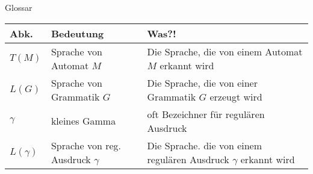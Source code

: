 \begin{frame}[fragile]{Glossar}
	\small
	\begin{tabular}{p{} p{} p{}}
		\toprule
		Abk.        & Bedeutung                          & Was?!                                                               \\
		\midrule
		$T(M)$        & Sprache von Automat $M$              & Die Sprache, die von einem Automat $M$ erkannt wird                   \\
		$L(G)$        & Sprache von Grammatik $G$            & Die Sprache, die von einer Grammatik $G$ erzeugt wird                 \\
		$\gamma$    & kleines Gamma                      & oft Bezeichner für regulären Ausdruck                               \\
		$L(\gamma)$ & Sprache von reg. Ausdruck $\gamma$ & Die Sprache. die von einem regulären Ausdruck $\gamma$ erkannt wird \\
		\bottomrule
	\end{tabular}
\end{frame}